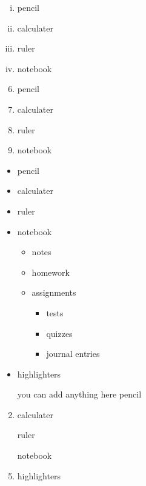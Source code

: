 \documentclass[11pt]{article}
\begin{document}
\begin{enumerate}[i.]
\item pencil
\item calculater
\item ruler
\item notebook
\end{enumerate}

\begin{enumerate}\setcounter{enumi}{5}
\item pencil
\item calculater
\item ruler
\item notebook
\end{enumerate}

\pagebreak

\begin{itemize}
\item pencil
\item calculater
\item ruler
\item notebook
	\begin{itemize}
	\item notes
	\item homework
	\item assignments
		\begin{itemize}
		\item tests
		\item quizzes
		\item journal entries
	
		\end{itemize}
	\end{itemize}
\item highlighters
\end{itemize}

\vspace{1in}

\begin{enumerate}
\item[you can add anything here] pencil
\item calculater
\item[] ruler
\item[] notebook
\item highlighters
\end{enumerate}
\end{document}
